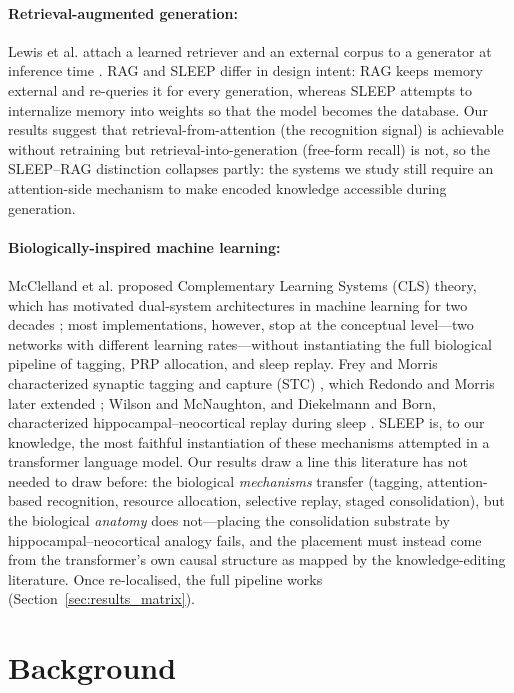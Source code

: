 \paragraph{Retrieval-augmented generation:}
Lewis et al. attach a learned retriever and an external corpus to a generator at inference time \citep{lewis2020retrieval}. RAG and SLEEP differ in design intent: RAG keeps memory external and re-queries it for every generation, whereas SLEEP attempts to internalize memory into weights so that the model becomes the database. Our results suggest that retrieval-from-attention (the recognition signal) is achievable without retraining but retrieval-into-generation (free-form recall) is not, so the SLEEP--RAG distinction collapses partly: the systems we study still require an attention-side mechanism to make encoded knowledge accessible during generation.

\paragraph{Biologically-inspired machine learning:}
McClelland et al. proposed Complementary Learning Systems (CLS) theory, which has motivated dual-system architectures in machine learning for two decades \citep{mcclelland1995why}; most implementations, however, stop at the conceptual level---two networks with different learning rates---without instantiating the full biological pipeline of tagging, PRP allocation, and sleep replay. Frey and Morris characterized synaptic tagging and capture (STC) \citep{frey1997synaptic}, which Redondo and Morris later extended \citep{redondo2011making}; Wilson and McNaughton, and Diekelmann and Born, characterized hippocampal--neocortical replay during sleep \citep{wilson1994reactivation,diekelmann2010memory}. SLEEP is, to our knowledge, the most faithful instantiation of these mechanisms attempted in a transformer language model. Our results draw a line this literature has not needed to draw before: the biological \emph{mechanisms} transfer (tagging, attention-based recognition, resource allocation, selective replay, staged consolidation), but the biological \emph{anatomy} does not---placing the consolidation substrate by hippocampal--neocortical analogy fails, and the placement must instead come from the transformer's own causal structure as mapped by the knowledge-editing literature. Once re-localised, the full pipeline works (Section~\ref{sec:results_matrix}).

\section{Background}
\label{sec:background}

